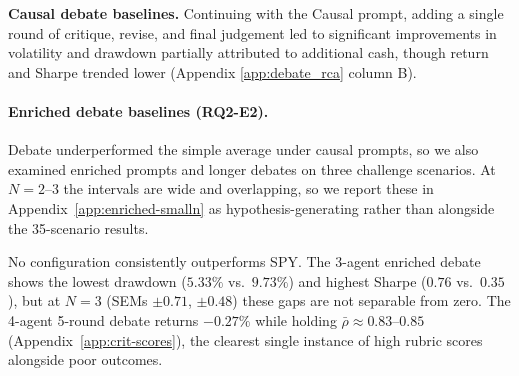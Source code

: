 \documentclass{article}
\begin{document}
\textbf{Causal debate baselines.} Continuing with the Causal prompt, adding a single round of critique, revise, and final judgement led to significant improvements in volatility and drawdown partially attributed to additional cash, though return and Sharpe trended lower (Appendix \ref{app:debate_rca} column B). 
 





\paragraph{Enriched debate baselines (RQ2-E2).}
Debate underperformed the simple average under causal prompts, so we also examined enriched prompts and longer debates on three challenge scenarios. At $N{=}2$--$3$ the intervals are wide and overlapping, so we report these in Appendix~\ref{app:enriched-smalln} as hypothesis-generating rather than alongside the 35-scenario results.


No configuration consistently outperforms SPY. The 3-agent enriched debate shows the lowest drawdown ($5.33\%$ vs.\ $9.73\%$) and highest Sharpe ($0.76$ vs.\ $0.35$), but at $N{=}3$ (SEMs $\pm0.71$, $\pm0.48$) these gaps are not separable from zero. The 4-agent 5-round debate returns $-0.27\%$ while holding $\bar{\rho}\approx0.83$--$0.85$ (Appendix~\ref{app:crit-scores}), the clearest single instance of high rubric scores alongside poor outcomes.
\end{document}
